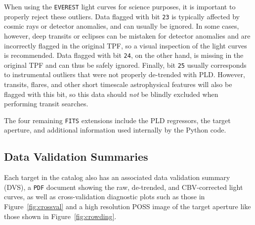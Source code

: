 \documentclass[]{aastex62}
\begin{document}
%
When using the \texttt{EVEREST} light curves for science purposes, it is important
to properly reject these outliers. Data flagged with bit \texttt{23} is typically
affected by cosmic rays or detector anomalies, and can usually be ignored. In
some cases, however, deep transits or eclipses can be mistaken for detector
anomalies and are incorrectly flagged in the original TPF, so a visual inspection
of the light curves is recommended. Data flagged with bit \texttt{24}, on the other
hand, is missing in the original TPF and can thus be safely ignored. Finally, bit
\texttt{25} usually corresponds to instrumental outliers that were not properly
de-trended with PLD. However, transits, flares, and other short timescale astrophysical
features will also be flagged with this bit, so this data should \emph{not} be
blindly excluded when performing transit searches.

The four remaining \texttt{FITS} extensions include the PLD regressors, the target aperture,
and additional information used internally by the Python code.

\subsection{Data Validation Summaries}
\label{sec:dvs}
Each target in the catalog also has an associated data validation summary (DVS), a
\texttt{PDF} document showing the raw, de-trended, and CBV-corrected light curves,
as well as cross-validation diagnostic plots such as those in Figure~\ref{fig:crossval}
and a high resolution POSS image of the target aperture like those shown in
Figure~\ref{fig:crowding}.
\end{document}
